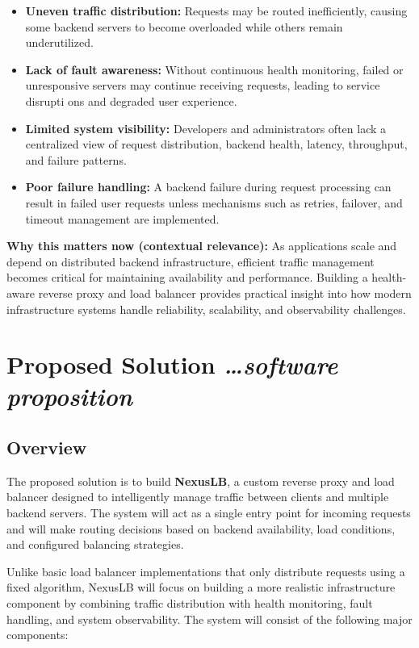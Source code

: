 \documentclass[11pt,a4paper]{article}
\newcommand{\BvrHint}[1]{%
  {\normalfont\normalsize\itshape\hfill #1}}
\begin{document}
\begin{itemize}
    \item \textbf{Uneven traffic distribution:} Requests may be routed inefficiently, causing some backend servers to become overloaded while others remain underutilized.

    \item \textbf{Lack of fault awareness:} Without continuous health monitoring, failed or unresponsive servers may continue receiving requests, leading to service disrupti   ons and degraded user experience.

    \item \textbf{Limited system visibility:} Developers and administrators often lack a centralized view of request distribution, backend health, latency, throughput, and failure patterns.

    \item \textbf{Poor failure handling:} A backend failure during request processing can result in failed user requests unless mechanisms such as retries, failover, and timeout management are implemented.
\end{itemize}

\textbf{Why this matters now (contextual relevance):} As applications scale and depend on distributed backend infrastructure, efficient traffic management becomes critical for maintaining availability and performance. Building a health-aware reverse proxy and load balancer provides practical insight into how modern infrastructure systems handle reliability, scalability, and observability challenges.

\section{Proposed Solution %
\BvrHint{\ldots software proposition}}

\subsection{Overview}

The proposed solution is to build \textbf{NexusLB}, a custom reverse proxy and load balancer designed to intelligently manage traffic between clients and multiple backend servers. The system will act as a single entry point for incoming requests and will make routing decisions based on backend availability, load conditions, and configured balancing strategies.

Unlike basic load balancer implementations that only distribute requests using a fixed algorithm, NexusLB will focus on building a more realistic infrastructure component by combining traffic distribution with health monitoring, fault handling, and system observability. The system will consist of the following major components:
\end{document}
